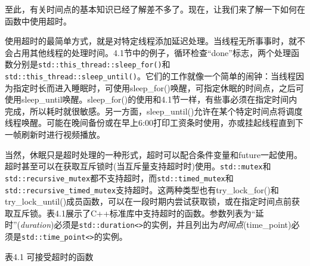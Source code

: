 至此，有关时间点的基本知识已经了解差不多了。现在，让我们来了解一下如何在函数中使用超时。


使用超时的最简单方式，就是对特定线程添加延迟处理。当线程无所事事时，就不会占用其他线程的处理时间。4.1节中的例子，循环检查“done”标志，两个处理函数分别是\texttt{std::this\_thread::sleep\_for()}和\texttt{std::this\_thread::sleep\_until()}。它们的工作就像一个简单的闹钟：当线程因为指定时长而进入睡眠时，可使用sleep\_for()唤醒，可指定休眠的时间点，之后可使用sleep\_until唤醒。sleep\_for()的使用和4.1节一样，有些事必须在指定时间内完成，所以耗时就很敏感。另一方面，sleep\_until()允许在某个特定时间点将调度线程唤醒。可能在晚间备份或在早上6:00打印工资条时使用，亦或挂起线程直到下一帧刷新时进行视频播放。

当然，休眠只是超时处理的一种形式，超时可以配合条件变量和future一起使用。超时甚至可以在获取互斥锁时(当互斥量支持超时时)使用。\texttt{std::mutex}和\texttt{std::recursive\_mutex}都不支持超时，而\texttt{std::timed\_mutex}和\texttt{std::recursive\_timed\_mutex}支持超时。这两种类型也有try\_lock\_for()和try\_lock\_until()成员函数，可以在一段时期内尝试获取锁，或在指定时间点前获取互斥锁。表4.1展示了C++标准库中支持超时的函数。参数列表为“延时”(\textit{duration})必须是\texttt{std::duration<>}的实例，并且列出为\textit{时间点}(time\_point)必须是\texttt{std::time\_point<>}的实例。

表4.1 可接受超时的函数


